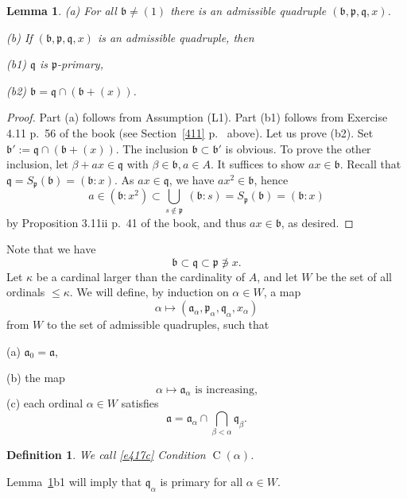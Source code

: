 \documentclass[parskip=half,fontsize=12pt]{scrartcl}%
\newcommand{\oo}{\operatorname}\newcommand{\ooo}{\operatorname*}
\newcommand{\mf}{\mathfrak}
\newcommand{\aaa}{\mf a}
\newcommand{\bbb}{\mf b}
\newcommand{\ppp}{\mf p}
\newcommand{\qqq}{\mf q}
\newtheorem{df}[thm]{Definition}
\newtheorem{lem}[thm]{Lemma}
\begin{document}
\begin{lem}\label{l417}
 \emph{(a)} For all $\bbb\ne(1)$ there is an admissible quadruple $(\bbb,\ppp,\qqq,x)$.

\emph{(b)} If $(\bbb,\ppp,\qqq,x)$ is an admissible quadruple, then 

\emph{(b1)} $\mathfrak q$ is $\mathfrak p$-primary, 

\emph{(b2)} $\bbb=\mathfrak q\cap(\bbb+(x))$.
\end{lem}

\begin{proof}
Part (a) follows from Assumption (L1). Part (b1) follows from Exercise 4.11 p.~56 of the book (see Section~\ref{411} p.~\pageref{411} above). Let us prove (b2). Set $\bbb':=\mathfrak q\cap(\bbb+(x))$. The inclusion $\bbb\subset\bbb'$ is obvious. To prove the other inclusion, let $\beta+ax\in\qqq$ with $\beta\in\bbb,a\in A$. It suffices to show $ax\in\bbb$. Recall that $\qqq=S_{\ppp}(\bbb)=(\bbb:x)$. As $ax\in\qqq$, we have $ax^2\in\bbb$, hence 
$$
a\in(\bbb:x^2)\subset\bigcup_{s\notin\ppp}\ (\bbb:s)=S_{\ppp}(\bbb)=(\bbb:x)
$$ 
by Proposition 3.11ii p.~41 of the book, and thus $ax\in\bbb$, as desired. 
\end{proof}

Note that we have 
$$
\bbb\subset\qqq\subset\ppp\not\ni x.
$$
Let $\kappa$ be a cardinal larger than the cardinality of $A$, and let $W$ be the set of all ordinals $\le\kappa$. We will define, by induction on $\alpha\in W$, a map 
\begin{equation}\label{e417a}
\alpha\mapsto(\aaa_\alpha,\ppp_\alpha,\qqq_\alpha,x_\alpha)
\end{equation}
from $W$ to the set of admissible quadruples, such that 

(a) $\aaa_0=\aaa$, 

(b) the map 
\begin{equation}\label{e417b}
\alpha\mapsto\aaa_\alpha\text{ is increasing,}
\end{equation} 
(c) each ordinal $\alpha\in W$ satisfies 
\begin{equation}\label{e417c}
\aaa=\aaa_\alpha\cap\bigcap_{\beta<\alpha}\qqq_\beta.
\end{equation}
\begin{df}\label{calpha}
We call \eqref{e417c} Condition $\oo C(\alpha)$. 
\end{df}

Lemma~\ref{l417}b1 will imply that $\qqq_\alpha$ is primary for all $\alpha\in W$. 
\end{document}
